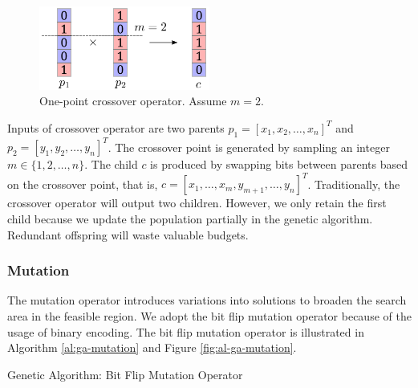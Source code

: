 \documentclass{article}
\begin{document}
\begin{figure}[!ht]
 \begin{center}    
     \includegraphics[width=0.5\textwidth]{ga/ga-crossover.png}
 \end{center}
 \caption{One-point crossover operator. Assume $m = 2$.}
 \label{fig:al-ga-crossover}
\end{figure}

Inputs of crossover operator are two parents $p_1 = \left[x_1, x_2, \dots, x_n \right]^T$ and $p_2 = \left[ y_1, y_2, \dots, y_n \right]^T$. The crossover point is generated by sampling an integer $m\in\{1, 2, \dots, n\}$. The child $c$ is produced by swapping bits between parents based on the crossover point, that is, $c = \left[x_1, \dots, x_m, y_{m + 1}, \dots, y_n  \right]^T $. Traditionally, the crossover operator will output two children. However, we only retain the first child because we update the population partially in the genetic algorithm. Redundant offspring will waste valuable budgets.

\subsubsection{Mutation}
\label{subsubsec:mutation}
The mutation operator introduces variations into solutions to broaden the search area in the feasible region. We adopt the bit flip mutation operator because of the usage of binary encoding. The bit flip mutation operator is illustrated in Algorithm \ref{al:ga-mutation} and Figure \ref{fig:al-ga-mutation}.

\begin{algorithm}[!ht]
\SetAlgoLined
{}
\BlankLine
{}
\caption{Genetic Algorithm: Bit Flip Mutation Operator}\label{al:ga-mutation}
\end{algorithm}
\end{document}
